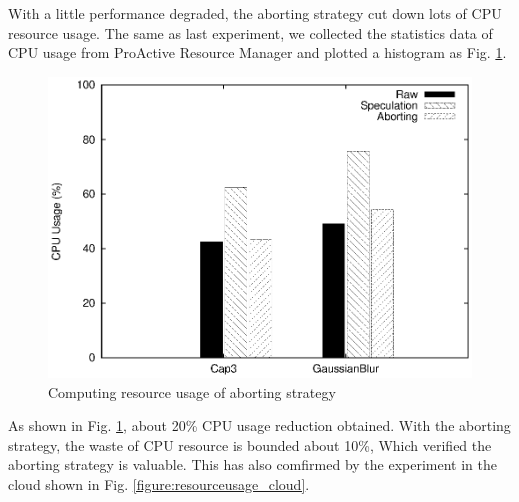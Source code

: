 With a little performance degraded, the aborting strategy cut down lots of CPU resource
usage. The same as last experiment, we collected the statistics data of CPU usage from
ProActive Resource Manager and plotted a histogram as Fig.
\ref{figure:abort_resourceusage}.

\begin{figure}
\centering
\includegraphics[width=0.9\columnwidth]{figures/abort_resource_usage.eps}
\caption{Computing resource usage of aborting strategy}
\label{figure:abort_resourceusage}
\end{figure}

As shown in Fig. \ref{figure:abort_resourceusage}, about 20\% CPU usage reduction
obtained. With the aborting strategy, the waste of CPU resource is bounded about 10\%,
Which verified the aborting strategy is valuable. This has also comfirmed by the
experiment in the cloud shown in Fig. \ref{figure:resourceusage_cloud}. 
